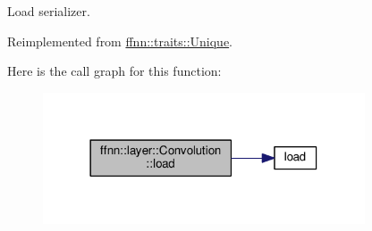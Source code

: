 Load serializer. 



Reimplemented from \hyperlink{classffnn_1_1traits_1_1_unique_af1e937c2908ed2ff707d6a7d1b5b13d2}{ffnn\-::traits\-::\-Unique}.



Here is the call graph for this function\-:\nopagebreak
\begin{figure}[H]
\begin{center}
\leavevmode
\includegraphics[width=270pt]{classffnn_1_1layer_1_1_convolution_ab7cbb5594feeb2f614e83e2fc8e2b491_cgraph}
\end{center}
\end{figure}


